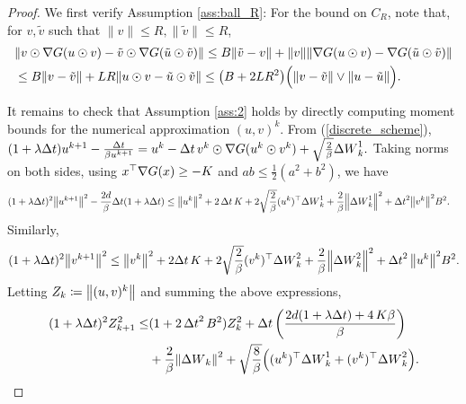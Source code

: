 \documentclass[11pt, twoside]{report}
\begin{document}
\begin{proof}%
We first verify Assumption \ref{ass:ball_R}:
For the bound on $C_R$,  note that, for $v,\tilde{v}$ such that $\|v\|\leq R,\|\tilde{v}\|\leq R$,
\begin{align*}
   & \norm{v \odot\nabla G(u\odot v) -\tilde v \odot\nabla G(\tilde u\odot \tilde v)}
\leq \cinfty \norm{\tilde v - v} + \norm{v} \norm{\nabla G(u\odot v) - \nabla G(\tilde u\odot \tilde v)}\\
&\leq \cinfty\norm{v-\tilde v} + \clip R\norm{u\odot v-\tilde u\odot \tilde v}
\leq \pa{\cinfty + 2 \clip R^2} \Bigl(\norm{v-\tilde v} \vee\norm{u-\tilde u}\Bigr).
\end{align*}



It remains to check that Assumption \ref{ass:2} holds by directly computing  moment bounds for the numerical approximation $(u,v)^k$. From (\ref{discrete_scheme}),
$
   (1+\lambda {\Delta t}) u^{k+1} - \frac{{\Delta t}}{\beta u^{k+1}}
     =  u^k - {\Delta t}\, v^k \odot \nabla G(u^k\odot v^k) +\sqrt{\frac2\beta}{\Delta W}^1_k.
$
Taking norms on both sides, using $x^\top \nabla G(x)\ge -K$ and $ab\le \frac 12 (a^2+b^2)$, we have
\begin{align*}
    (1+\lambda \deltat)^2\norm{ u^{k+1} }^2  - \frac{2d}{\beta}\deltat (1+\lambda \deltat) 
    &\leq 
     \norm{u^k}^2 + 2\,\deltat\,\ccc +2\sqrt{\frac{2}{\beta}}(u^k)^\top\deltaw^1_k+ \frac{2}{\beta}\norm{\deltaw^1_k}^2 + \deltat^2 \norm{v^k}^2 \cinfty^2.
\end{align*}
Similarly, 
$$    (1+\lambda \deltat)^2 \norm{v^{k+1}}^2 \leq \norm{v^k}^2 + 2\deltat \,\ccc + 2\sqrt{\frac{2}{\beta}} (v^k)^\top \deltaw^2_k\nonumber+ \frac{2}{\beta}\norm{\deltaw^2_k}^2 + \deltat^2\, \norm{u^k}^2 \cinfty^2.
$$
Letting $Z_k\coloneq \left\lVert(u,v)^k\right\rVert$ and summing the above expressions,
\begin{align*}
    (1+\lambda \deltat)^2 Z_{k+1}^2 \leq &(1+2\,\deltat^2\, \cinfty^2)Z_k^2 + \deltat \,\pa{\frac{2d(1+\lambda \deltat)+4\,\ccc\beta}{\beta} } 
    \\& + \frac2\beta\norm{\deltaw_k}^2 + \sqrt{\frac8\beta}\Bigl((u^k)^\top \deltaw^1_k +  (v^k)^\top \deltaw^2_k\Bigr).

\end{align*}
\end{proof}
\end{document}
